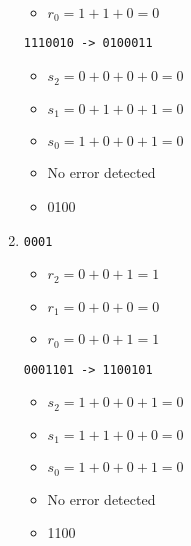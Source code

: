 \documentclass{article}
\begin{document}
\begin{multicols}{2}
\begin{enumerate}
\begin{itemize}
        \item \(r_0 = 1 + 1 + 0 = 0\)
    \end{itemize}
    \verb|1110010 -> 0100011|
    \begin{itemize}
        \item \(s_2 = 0 + 0 + 0 + 0 = 0\)
        \item \(s_1 = 0 + 1 + 0 + 1 = 0\)
        \item \(s_0 = 1 + 0 + 0 + 1 = 0\)
        \item No error detected
        \item 0100
    \end{itemize}
    \item \verb|0001|
    \begin{itemize}
        \item \(r_2 = 0 + 0 + 1 = 1\)
        \item \(r_1 = 0 + 0 + 0 = 0\)
        \item \(r_0 = 0 + 0 + 1 = 1\)
    \end{itemize}
    \verb|0001101 -> 1100101|
    \begin{itemize}
        \item \(s_2 = 1 + 0 + 0 + 1 = 0\)
        \item \(s_1 = 1 + 1 + 0 + 0 = 0\)
        \item \(s_0 = 1 + 0 + 0 + 1 = 0\)
        \item No error detected
        \item 1100
    \end{itemize}
\end{enumerate}

\end{multicols}
\end{document}
